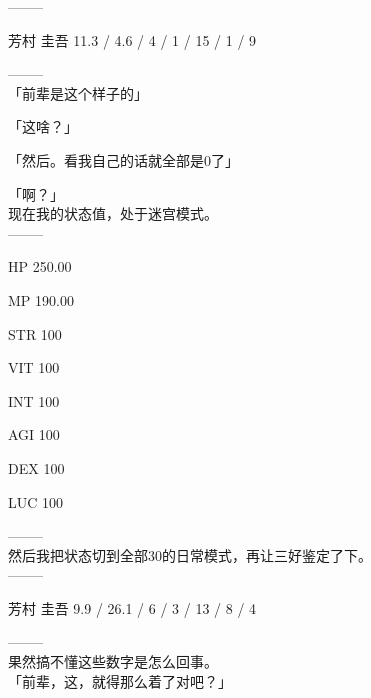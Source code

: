   --------

  芳村 圭吾 11.3 / 4.6 / 4 / 1 / 15 / 1 / 9

  --------\\

「前辈是这个样子的」

「这啥？」

「然后。看我自己的话就全部是0了」

「啊？」\\

现在我的状态值，处于迷宫模式。\\

  --------

  HP 250.00

  MP 190.00

%  


  STR 100

  VIT 100

  INT 100

  AGI 100

  DEX 100

  LUC 100

  --------\\

然后我把状态切到全部30的日常模式，再让三好鉴定了下。\\

  --------

  芳村 圭吾 9.9 / 26.1 / 6 / 3 / 13 / 8 / 4

  --------\\

果然搞不懂这些数字是怎么回事。\\

「前辈，这，就得那么着了对吧？」

